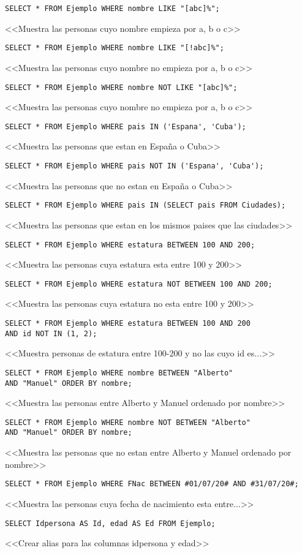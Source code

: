 \documentclass[a4paper, 11pt, titlepage]{article}
\begin{document}
\begin{verbatim}
SELECT * FROM Ejemplo WHERE nombre LIKE "[abc]%";
\end{verbatim}
<<Muestra las personas cuyo nombre empieza por a, b o c>>
\begin{verbatim}
SELECT * FROM Ejemplo WHERE nombre LIKE "[!abc]%";
\end{verbatim}
<<Muestra las personas cuyo nombre no empieza por a, b o c>>
\begin{verbatim}
SELECT * FROM Ejemplo WHERE nombre NOT LIKE "[abc]%";
\end{verbatim}
<<Muestra las personas cuyo nombre no empieza por a, b o c>>
\begin{verbatim}
SELECT * FROM Ejemplo WHERE pais IN ('Espana', 'Cuba');
\end{verbatim}
<<Muestra las personas que estan en España o Cuba>>
\begin{verbatim}
SELECT * FROM Ejemplo WHERE pais NOT IN ('Espana', 'Cuba');
\end{verbatim}
<<Muestra las personas que no estan en España o Cuba>>
\begin{verbatim}
SELECT * FROM Ejemplo WHERE pais IN (SELECT pais FROM Ciudades);
\end{verbatim}
<<Muestra las personas que estan en los mismos paises que las ciudades>>
\begin{verbatim}
SELECT * FROM Ejemplo WHERE estatura BETWEEN 100 AND 200;
\end{verbatim}
<<Muestra las personas cuya estatura esta entre 100 y 200>>
\begin{verbatim}
SELECT * FROM Ejemplo WHERE estatura NOT BETWEEN 100 AND 200;
\end{verbatim}
<<Muestra las personas cuya estatura no esta entre 100 y 200>>
\begin{verbatim}
SELECT * FROM Ejemplo WHERE estatura BETWEEN 100 AND 200 
AND id NOT IN (1, 2);
\end{verbatim}
<<Muestra personas de estatura entre 100-200 y no las cuyo id es...>>
\begin{verbatim}
SELECT * FROM Ejemplo WHERE nombre BETWEEN "Alberto" 
AND "Manuel" ORDER BY nombre;
\end{verbatim}
<<Muestra las personas entre Alberto y Manuel ordenado por nombre>>
\begin{verbatim}
SELECT * FROM Ejemplo WHERE nombre NOT BETWEEN "Alberto" 
AND "Manuel" ORDER BY nombre;
\end{verbatim}
<<Muestra las personas que no estan entre Alberto y Manuel ordenado por nombre>>
\begin{verbatim}
SELECT * FROM Ejemplo WHERE FNac BETWEEN #01/07/20# AND #31/07/20#;
\end{verbatim}
<<Muestra las personas cuya fecha de nacimiento esta entre...>>
\begin{verbatim}
SELECT Idpersona AS Id, edad AS Ed FROM Ejemplo;   
\end{verbatim}
<<Crear alias para las columnas idpersona y edad>>
\end{document}

